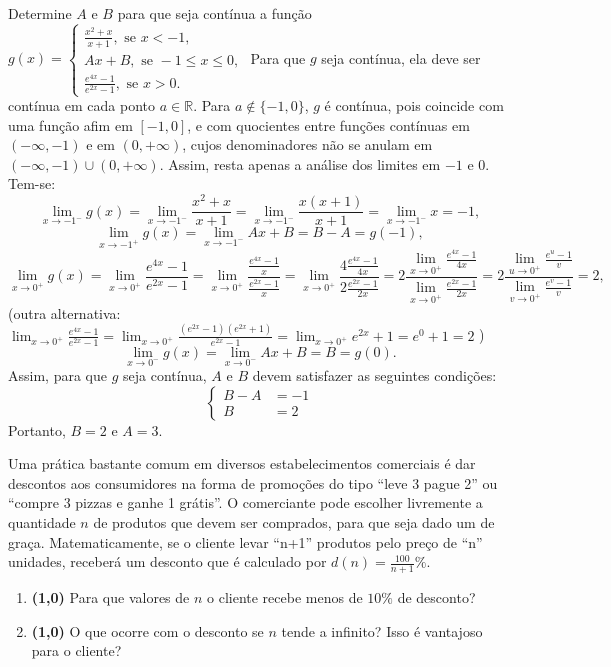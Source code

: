 \documentclass[12pt,a4paper]{article}
\newcommand*\R{\mathbb{R}}
\begin{document}
\begin{ExerciseList}
\Exercise[title={2,0}] Determine $A$ e $B$ para que seja contínua a função
$
g(x) =
\begin{cases}
\frac{x^2 + x}{x+1}, \text{ se } x < -1,\\
Ax + B, \text{ se } -1 \leq x \leq 0,\\
\frac{e^{4x}-1}{e^{2x}-1}, \text{ se } x > 0.
\end{cases}$
\Answer Para que $g$ seja contínua, ela deve ser contínua em cada ponto $a \in \R$. Para $a \not\in \{-1, 0\}$, $g$ é contínua, pois coincide com uma função afim em $[-1, 0]$, e com quocientes entre funções contínuas em $(-\infty, -1)$ e em $(0, +\infty)$, cujos denominadores não se anulam em $(-\infty, -1) \cup (0, +\infty)$. Assim, resta apenas a análise dos limites em $-1$ e $0$. Tem-se:
\[
\lim_{x \to -1^-} g(x)
= \lim_{x \to -1^-} \frac{x^2 + x}{x+1}
= \lim_{x \to -1^-} \frac{x(x + 1)}{x+1}
= \lim_{x \to -1^-} x
= -1,
\]
\[
\lim_{x \to -1^+} g(x)
= \lim_{x \to -1^-} Ax+B
= B-A = g(-1),
\]
\[
\lim_{x \to 0^+} g(x)
= \lim_{x \to 0^+} \frac{e^{4x}-1}{e^{2x}-1}
= \lim_{x \to 0^+} \frac{ \frac{e^{4x}-1}{x} }
                        { \frac{e^{2x}-1}{x} }
= \lim_{x \to 0^+} \frac{ 4\frac{e^{4x}-1}{4x} }
                        { 2\frac{e^{2x}-1}{2x} }
= 2 \frac{ \lim_{x \to 0^+} \frac{e^{4x}-1}{4x} }
         { \lim_{x \to 0^+} \frac{e^{2x}-1}{2x} }
= 2 \frac{ \lim_{u \to 0^+} \frac{e^{u}-1}{v} }
         { \lim_{v \to 0^+} \frac{e^{v}-1}{v} }
= 2,
\]
(outra alternativa:
$\lim_{x \to 0^+} \frac{e^{4x}-1}{e^{2x}-1}
= \lim_{x \to 0^+} \frac{(e^{2x}-1)(e^{2x}+1)}{e^{2x}-1}
= \lim_{x \to 0^+} e^{2x}+1
= e^0 + 1 = 2$
)
\[
\lim_{x \to 0^-} g(x)
= \lim_{x \to 0^-} Ax+B
= B = g(0).
\]
Assim, para que $g$ seja contínua, $A$ e $B$ devem satisfazer as seguintes condições:
\[
\begin{cases}
B-A & = -1\\ 
B   & = 2
\end{cases}
\]
Portanto, $B = 2$ e $A = 3$.

\Exercise
Uma prática bastante comum em diversos estabelecimentos comerciais é dar descontos aos consumidores na forma de promoções do tipo ``leve 3 pague 2'' ou ``compre 3 pizzas e ganhe 1 grátis''. O comerciante pode escolher livremente a quantidade $n$ de produtos que devem ser comprados, para que seja dado um de graça. Matematicamente, se o cliente levar ``n+1'' produtos pelo preço de ``n'' unidades, receberá um desconto que é calculado por $d(n) = \frac{100}{n+1} \%$.
\begin{enumerate}
\item \textbf{(1,0)} Para que valores de $n$ o cliente recebe menos de $10\%$ de desconto?
\item \textbf{(1,0)} O que ocorre com o desconto se $n$ tende a infinito? Isso é vantajoso para o cliente?
\end{enumerate}


\end{ExerciseList}
\end{document}

